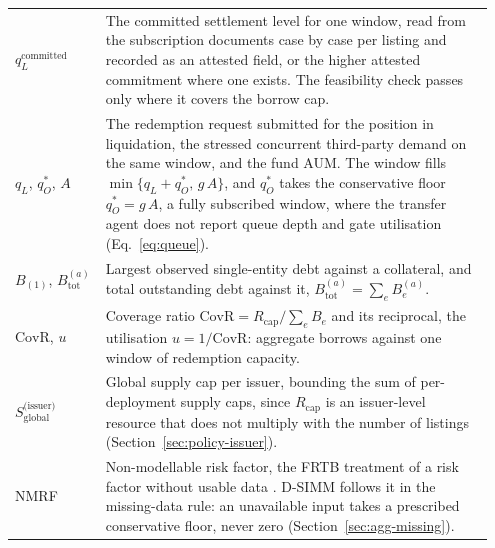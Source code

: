 \begin{longtable}{@{}p{0.18\linewidth} p{0.77\linewidth}@{}}
$q_L^{\mathrm{committed}}$ & The committed settlement level for one window, read from the subscription documents case by case per listing and recorded as an attested field, or the higher attested commitment where one exists. The feasibility check passes only where it covers the borrow cap.\\
$q_L$, $q_O^{*}$, $A$ & The redemption request submitted for the position in liquidation, the stressed concurrent third-party demand on the same window, and the fund AUM. The window fills $\min\{q_L+q_O^{*},\,g\,A\}$, and $q_O^{*}$ takes the conservative floor $q_O^{*}=g\,A$, a fully subscribed window, where the transfer agent does not report queue depth and gate utilisation (Eq.~\eqref{eq:queue}).\\
$B_{(1)}$, $B_{\mathrm{tot}}^{(a)}$ & Largest observed single-entity debt against a collateral, and total outstanding debt against it, $B_{\mathrm{tot}}^{(a)}=\sum_e B_e^{(a)}$.\\
$\mathrm{CovR}$, $u$ & Coverage ratio $\mathrm{CovR} = R_{\mathrm{cap}}/\sum_e B_e$ and its reciprocal, the utilisation $u = 1/\mathrm{CovR}$: aggregate borrows against one window of redemption capacity.\\
$S_{\mathrm{global}}^{\text{(issuer)}}$ & Global supply cap per issuer, bounding the sum of per-deployment supply caps, since $R_{\mathrm{cap}}$ is an issuer-level resource that does not multiply with the number of listings (Section~\ref{sec:policy-issuer}).\\
NMRF & Non-modellable risk factor, the FRTB treatment of a risk factor without usable data \cite{bcbs_frtb_d457}. D-SIMM follows it in the missing-data rule: an unavailable input takes a prescribed conservative floor, never zero (Section~\ref{sec:agg-missing}).\\
\bottomrule
\end{longtable}
